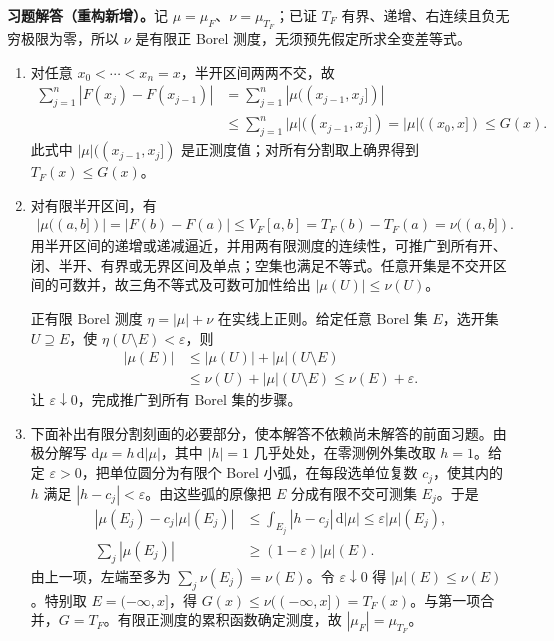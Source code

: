 \documentclass[../../main.tex]{subfiles}%
\begin{document}
\begin{solution}
\label{solution:ch03-variation-measure-equality}
\textbf{习题解答（重构新增）。}记 $\mu=\mu_F$、$\nu=\mu_{T_F}$；已证 $T_F$ 有界、递增、右连续且负无穷极限为零，所以 $\nu$ 是有限正 Borel 测度，无须预先假定所求全变差等式。
\begin{enumerate}
\item 对任意 $x_0<\cdots<x_n=x$，半开区间两两不交，故
\begin{align*}
\sum_{j=1}^n|F(x_j)-F(x_{j-1})|
&=\sum_{j=1}^n|\mu((x_{j-1},x_j])|\\
&\le\sum_{j=1}^n|\mu|((x_{j-1},x_j])
=|\mu|((x_0,x])\le G(x).
\end{align*}
此式中 $|\mu|((x_{j-1},x_j])$ 是正测度值；对所有分割取上确界得到 $T_F(x)\le G(x)$。
\item 对有限半开区间，有
\begin{align*}
|\mu((a,b])|=|F(b)-F(a)|\le V_F[a,b]=T_F(b)-T_F(a)=\nu((a,b]).
\end{align*}
用半开区间的递增或递减逼近，并用两有限测度的连续性，可推广到所有开、闭、半开、有界或无界区间及单点；空集也满足不等式。任意开集是不交开区间的可数并，故三角不等式及可数可加性给出 $|\mu(U)|\le\nu(U)$。

正有限 Borel 测度 $\eta=|\mu|+\nu$ 在实线上正则。给定任意 Borel 集 $E$，选开集 $U\supseteq E$，使 $\eta(U\setminus E)<\varepsilon$，则
\begin{align*}
|\mu(E)|&\le|\mu(U)|+|\mu|(U\setminus E)\\
&\le\nu(U)+|\mu|(U\setminus E)\le\nu(E)+\varepsilon.
\end{align*}
让 $\varepsilon\downarrow0$，完成推广到所有 Borel 集的步骤。
\item 下面补出有限分割刻画的必要部分，使本解答不依赖尚未解答的前面习题。由极分解写 $\mathrm d\mu=h\,\mathrm d|\mu|$，其中 $|h|=1$ 几乎处处，在零测例外集改取 $h=1$。给定 $\varepsilon>0$，把单位圆分为有限个 Borel 小弧，在每段选单位复数 $c_j$，使其内的 $h$ 满足 $|h-c_j|<\varepsilon$。由这些弧的原像把 $E$ 分成有限不交可测集 $E_j$。于是
\begin{align*}
\left|\mu(E_j)-c_j|\mu|(E_j)\right|
&\le\int_{E_j}|h-c_j|\,\mathrm d|\mu|\le\varepsilon|\mu|(E_j),\\
\sum_j|\mu(E_j)|&\ge(1-\varepsilon)|\mu|(E).
\end{align*}
由上一项，左端至多为 $\sum_j\nu(E_j)=\nu(E)$。令 $\varepsilon\downarrow0$ 得 $|\mu|(E)\le\nu(E)$。特别取 $E=(-\infty,x]$，得 $G(x)\le\nu((-\infty,x])=T_F(x)$。与第一项合并，$G=T_F$。有限正测度的累积函数确定测度，故 $|\mu_F|=\mu_{T_F}$。
\end{enumerate}
\end{solution}
\end{document}
